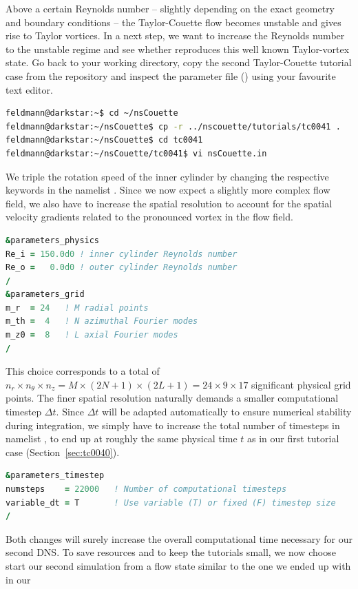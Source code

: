 \documentclass[a4paper, 11pt, DIV=11]{scrartcl}
\begin{document}
Above a certain Reynolds number -- slightly depending on the exact geometry and
boundary conditions -- the Taylor-Couette flow becomes unstable and gives rise
to Taylor vortices. In a next step, we want to increase the Reynolds number to
the unstable regime and see whether \nsc reproduces this well known Taylor-vortex
state. Go back to your working directory, copy the second Taylor-Couette tutorial
case from the repository and inspect the parameter file ()
using your favourite text editor.
\begin{lstlisting}[language=bash]
feldmann@darkstar:~$ cd ~/nsCouette
feldmann@darkstar:~/nsCouette$ cp -r ../nscouette/tutorials/tc0041 .
feldmann@darkstar:~/nsCouette$ cd tc0041
feldmann@darkstar:~/nsCouette/tc0041$ vi nsCouette.in
\end{lstlisting}
We triple the rotation speed of the inner cylinder by changing the respective
keywords in the namelist . Since we now expect a slightly
more complex flow field, we also have to increase the spatial resolution to
account for the spatial velocity gradients related to the pronounced vortex
in the flow field.
\begin{lstlisting}[language=Fortran]
&parameters_physics
Re_i = 150.0d0 ! inner cylinder Reynolds number
Re_o =   0.0d0 ! outer cylinder Reynolds number
/
&parameters_grid
m_r  = 24   ! M radial points
m_th =  4   ! N azimuthal Fourier modes
m_z0 =  8   ! L axial Fourier modes
/
\end{lstlisting}
This choice corresponds to a total of $n_r \times n_\theta  \times n_z=M \times
(2N+1) \times (2L+1) = \num{24} \times \num{9} \times \num{17}$ significant
physical grid points. The finer spatial resolution naturally demands a smaller
computational timestep $\Delta t$. Since $\Delta t$ will be adapted automatically
to ensure numerical stability during integration, we simply have to increase the
total number of timesteps in namelist , to end up at
roughly the same physical time $t$ as in our first tutorial case
(Section~\ref{sec:tc0040}).
\begin{lstlisting}[language=Fortran]
&parameters_timestep
numsteps    = 22000   ! Number of computational timesteps
variable_dt = T       ! Use variable (T) or fixed (F) timestep size
/
\end{lstlisting}
Both changes will
surely increase the overall computational time necessary for our second DNS.
To save resources and to keep the tutorials small, we now choose start our
second simulation from a flow state similar to the one we ended up with in our
\end{document}
